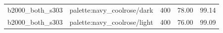 \begin{longtable}{l>{\raggedright\arraybackslash}p{.42\linewidth}rrr}
b2000\_\allowbreak{}both\_\allowbreak{}s303 & %
palette:navy\_\allowbreak{}coolrose/dark & %
400 & %
78.00 & %
99.14 \\ %

b2000\_\allowbreak{}both\_\allowbreak{}s303 & %
palette:navy\_\allowbreak{}coolrose/light & %
400 & %
76.00 & %
99.09 \\ %


\end{longtable}
